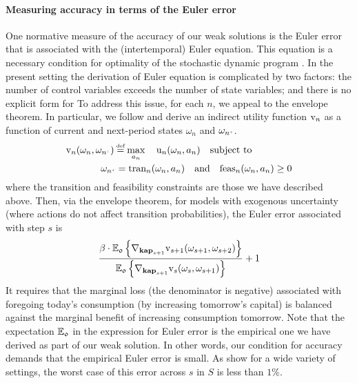 \documentclass[12pt,a4paper,twoside, draft]{article}
\begin{document}
\paragraph{Measuring accuracy in terms of the Euler error}
One normative measure of the accuracy of our weak solutions is the Euler error
that is associated with the (intertemporal) Euler equation.
This equation is a necessary condition for optimality of the stochastic dynamic
program \citet{Stokey_Lucas-Recursive}.
In the present setting the derivation of Euler equation is complicated by two
factors: the number of control variables exceeds the number of state variables;
and there is no explicit form for
To address this issue, for each $n$, we appeal to the envelope theorem.
In particular, we follow \citet{Gonzalez_Hernandez-Euler}
and derive an indirect utility function
$\textup{v}_{n}$ as a function of current and next-period states $\omega_{n}$
and $\omega_{n^{\mplus}}$.
\begin{align*}
   \textup{v}_{n}(\omega_{n}, \omega_{n^{\mplus}}) \defeq
   \max_{a_{n}}  \quad \textup{u}_{n}(\omega_{n}, a_{n}) \quad &
     \textup{subject to}\\
   \quad \omega_{n^{\mplus}} = \textup{tran}_{n}(\omega_{n}, a_{n}) \quad
   \textup{and} & \quad \textup{feas}_{n}(\omega_{n}, a_{n}) \geq 0
\end{align*}
where the transition and feasibility constraints are those we have described
above.
Then, via the envelope theorem, for models with exogenous uncertainty (where
actions do not affect transition probabilities), the Euler error associated
with step $s$ is
\begin{equation}
\frac{
  \beta \cdot \mathbb{E}_{\mathfrak{0}} \left\{
    \nabla_{\mathbf{kap}_{s+1}} \textup{v}_{s+1}(\omega_{s+1}, \omega_{s+2})
  \right\}
  }{\mathbb{E}_{\mathfrak{0}} \left\{
    \nabla_{\mathbf{kap}_{s+1}} \textup{v}_{s}(\omega_{s}, \omega_{s+1})
  \right\}
  } + 1
\end{equation}
It requires that the marginal loss (the denominator is negative) associated
with foregoing today's consumption (by increasing tomorrow's capital) is
balanced against the marginal benefit of increasing consumption tomorrow.
Note that the expectation $\mathbb E_{\mathfrak{0}}$ in the expression for
Euler error is the empirical one we have derived as part of our weak solution.
In other words, our condition for accuracy demands that the empirical Euler
error is small.
As \citet{CJ} show for a wide variety of settings, the worst case of this error
across $s$ in $S$ is less than $1\%$.
\end{document}
